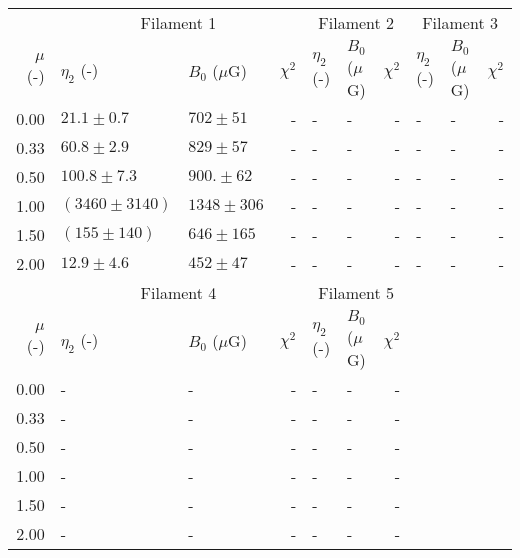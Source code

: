 \begin{tabular}{@{}rllr llr llr@{}}

\toprule
{} & \multicolumn{3}{c}{Filament 1}
   & \multicolumn{3}{c}{Filament 2}
   & \multicolumn{3}{c}{Filament 3} \\
\cmidrule(lr){2-4} \cmidrule(lr){5-7} \cmidrule(lr){8-10}
$\mu$ (-) & $\eta_2$ (-) & $B_0$ ($\mu$G) & $\chi^2$
          & $\eta_2$ (-) & $B_0$ ($\mu$G) & $\chi^2$
          & $\eta_2$ (-) & $B_0$ ($\mu$G) & $\chi^2$ \\

\midrule
0.00 & $21.1 \pm 0.7$ & $702 \pm 51$ & -
     & - & - & -
     & - & - & - \\
0.33 & $60.8 \pm 2.9$ & $829 \pm 57$ & -
     & - & - & -
     & - & - & - \\
0.50 & $100.8 \pm 7.3$ & $900. \pm 62$ & -
     & - & - & -
     & - & - & - \\
1.00 & $\left(3460 \pm 3140\right)$\tablenotemark{a} & $1348 \pm 306$ & -
     & - & - & -
     & - & - & - \\
1.50 & $\left(155 \pm 140\right)$\tablenotemark{a} & $646 \pm 165$ & -
     & - & - & -
     & - & - & - \\
2.00 & $12.9 \pm 4.6$ & $452 \pm 47$ & -
     & - & - & -
     & - & - & - \\

\midrule
{} & \multicolumn{3}{c}{Filament 4}
   & \multicolumn{3}{c}{Filament 5} \\
\cmidrule(lr){2-4} \cmidrule(lr){5-7}
$\mu$ (-) & $\eta_2$ (-) & $B_0$ ($\mu$G) & $\chi^2$
          & $\eta_2$ (-) & $B_0$ ($\mu$G) & $\chi^2$ \\

\cmidrule(lr){1-7}
0.00 & - & - & -
     & - & - & - \\
0.33 & - & - & -
     & - & - & - \\
0.50 & - & - & -
     & - & - & - \\
1.00 & - & - & -
     & - & - & - \\
1.50 & - & - & -
     & - & - & - \\
2.00 & - & - & -
     & - & - & - \\

\bottomrule
\end{tabular} 
